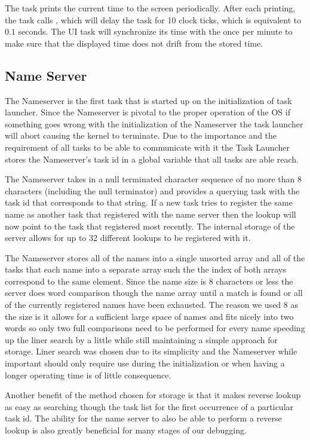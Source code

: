 \documentclass[pdftex,10pt,a4paper]{article}
\begin{document}
The  task prints the current time to the screen
periodically. After each printing, the task calls ,
which will delay the task for 10 clock ticks, which is equivalent to
$0.1$ seconds. The UI task will synchronize its time with the
 once per minute to make sure that the displayed
time does not drift from the stored time.


\subsection*{Name Server}

The Nameserver is the first task that is started up on the
initialization of task launcher. Since the Nameserver is pivotal to
the proper operation of the OS if something goes wrong with the
initialization of the Nameserver the task launcher will abort causing
the kernel to terminate. Due to the importance and the requirement of
all tasks to be able to communicate with it the Task Launcher stores
the Nameserver’s task id in a global variable that all tasks are able
reach.

The Nameserver takes in a null terminated character sequence of no
more than 8 characters (including the null terminator) and provides a
querying task with the task id that corresponds to that string. If a
new task tries to register the same name as another task that
registered with the name server then the lookup will now point to the
task that registered most recently. The internal storage of the server
allows for up to 32 different lookups to be registered with it.

The Nameserver stores all of the names into a single unsorted array
and all of the tasks that each name into a separate array such the the
index of both arrays correspond to the same element. Since the name
size is 8 characters or less the server does word comparison though
the name array until a match is found or all of the currently
registered names have been exhausted. The reason we used 8 as the size
is it allows for a sufficient large space of names and fits nicely
into two words so only two full comparisons need to be performed for
every name speeding up the liner search by a little while still
maintaining a simple approach for storage. Liner search was chosen due
to its simplicity and the Nameserver while important should only
require use during the initialization or when having a longer
operating time is of little consequence.

Another benefit of the method chosen for storage is that it makes reverse
lookup as easy as searching though the task list for the first occurrence
of a particular task id. The ability for the name server to also be able to
perform a reverse lookup is also greatly beneficial for many stages of our
debugging.
\end{document}
